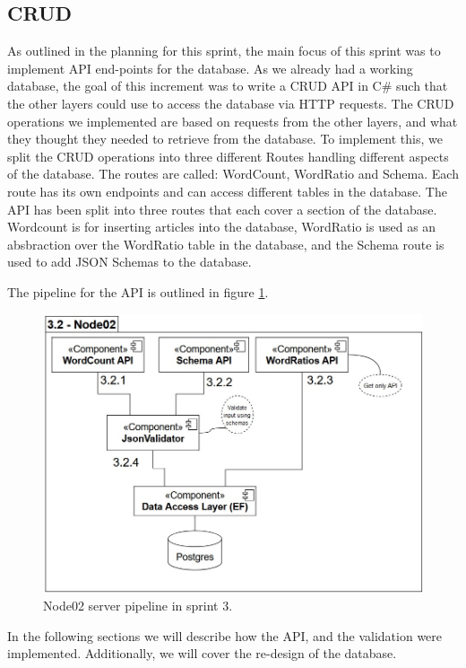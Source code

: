 \subsection{CRUD}

As outlined in the planning for this sprint, the main focus of this sprint was to implement API end-points for the database.
As we already had a working database, the goal of this increment was to write a CRUD API in C\# such that the other layers could use to access the database via HTTP requests.
The CRUD operations we implemented are based on requests from the other layers, and what they thought they needed to retrieve from the database.
To implement this, we split the CRUD operations into three different Routes handling different aspects of the database. The routes are called: WordCount, WordRatio and Schema. Each route has its own endpoints and can access different tables in the database. The API has been split into three routes that each cover a section of the database. Wordcount is for inserting articles into the database, WordRatio is used as an absbraction over the WordRatio table in the database, and the Schema route is used to add JSON Schemas to the database.

The pipeline for the API is outlined in figure \ref{Node02Sprint3}.

\begin{figure}[h]
    \centering
    \includegraphics[width=\linewidth]{Images/Node02Pipeline.jpg}
    \caption{Node02 server pipeline in sprint 3.}
    \label{Node02Sprint3}
\end{figure}

In the following sections we will describe how the API, and the validation were implemented. Additionally, we will cover the re-design of the database.

